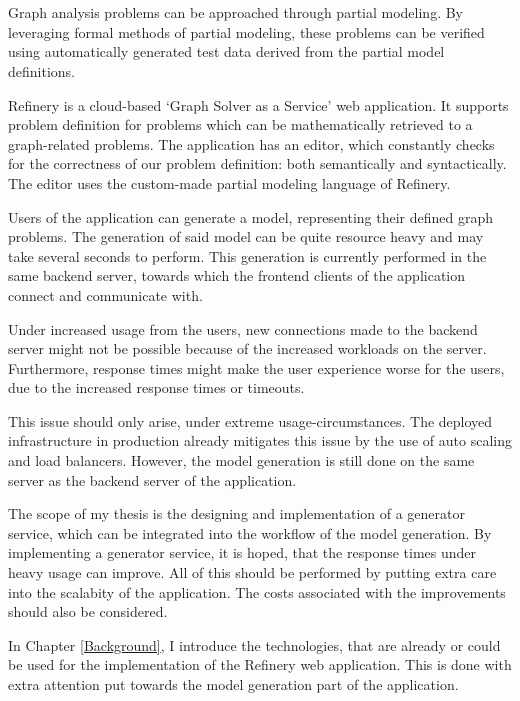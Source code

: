 \chapter{\bevezetes}

Graph analysis problems can be approached through partial modeling. By leveraging
formal methods of partial modeling, these problems can be verified using automatically
generated test data derived from the partial model definitions.

Refinery \cite{refinery} is a cloud-based `Graph Solver as a Service' web application. It supports problem
definition for problems which can be mathematically retrieved to a graph-related problems.
The application has an editor, which constantly checks for the correctness of our problem definition:
both semantically and syntactically. The editor uses the custom-made partial modeling language of Refinery.

Users of the application can generate a model, representing their defined graph problems. The generation of 
said model can be quite resource heavy and may take several seconds to perform. 
This generation is currently performed in the same backend server, towards which the frontend clients of the application
connect and communicate with. 

Under increased usage from the users, new connections made to the backend server might not be possible because of 
the increased workloads on the server. Furthermore, response times might make the user experience worse for the users, due to the increased response
times or timeouts.

This issue should only arise, under extreme usage-circumstances. The deployed infrastructure in production already mitigates this issue by 
the use of auto scaling and load balancers. However, the model generation is still done on the same server as the backend server of 
the application.

The scope of my thesis is the designing and implementation of a generator service, which can be integrated into the workflow of the model generation.
By implementing a generator service, it is hoped, that the response times under heavy usage can improve. All of this should be performed by 
putting extra care into the scalabity of the application. The costs associated with the improvements should also be considered.

In Chapter \ref{Background}, I introduce the technologies, that are already or could be used for the 
implementation of the Refinery web application.
This is done with extra attention put towards the model generation part of the application.

